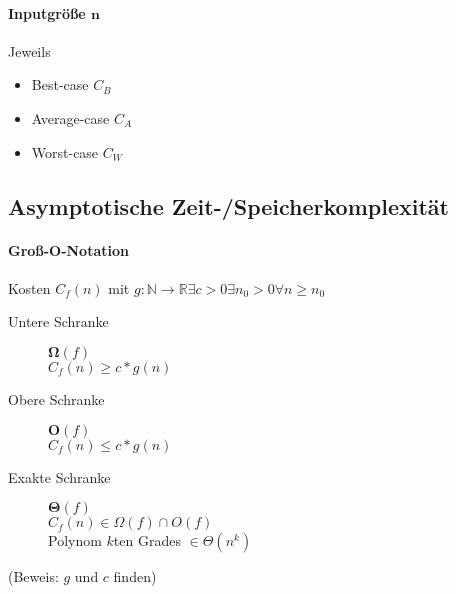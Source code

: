 \paragraph{Inputgrö\ss e $\mathbf{n}$} Jeweils

\begin{itemize}
  \item Best-case $C_B$
  \item Average-case $C_A$
  \item Worst-case $C_W$
\end{itemize}

\subsection{Asymptotische Zeit-/Speicherkomplexität}

\paragraph{Gro\ss-O-Notation}
Kosten $C_f(n)$ mit $g: \mathbb{N} \rightarrow \mathbb{R} \exists c > 0 \exists n_0 > 0 \forall n \geq n_0$

\begin{description}
  \item [Untere Schranke] $\boldsymbol{\Omega} (f)$ \\
        $C_f(n) \boldsymbol{\geq} c * g(n)$

  \item [Obere Schranke] $\boldsymbol{O}(f)$ \\
        $C_f(n) \boldsymbol{\leq} c * g(n)$

  \item [Exakte Schranke] $\boldsymbol{\Theta} (f)$ \\
        $C_f(n) \in \Omega (f) \cap O(f)$ \\
        Polynom $k$ten Grades $\in \Theta (n^k)$
\end{description}

(Beweis: $g$ und $c$ finden)

